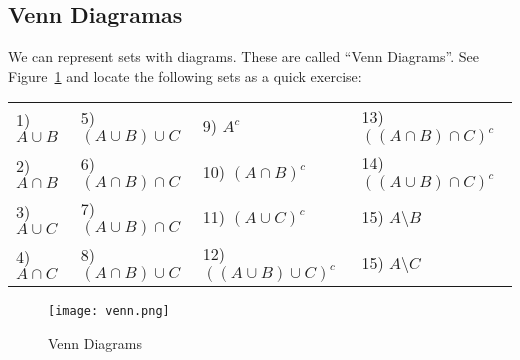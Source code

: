 \documentclass[11pt]{article}
\begin{document}
\subsection*{Venn Diagramas}
 We can represent sets with diagrams. These are called ``Venn Diagrams''. See Figure~\ref{f1} and locate the following sets as a quick exercise:\\

\begin{tabular}{llll}
	1) $A \cup B$ & 5) $(A \cup B) \cup C$ & 9) $A^c$ & 13) $((A \cap B) \cap C)^c$\\
	2) $A \cap B$ & 6) $(A \cap B) \cap C$ & 10) $(A \cap B)^c$ & 14) $((A \cup B) \cap C)^c$\\
	3) $A \cup C$ & 7) $(A \cup B) \cap C$ & 11) $(A \cup C)^c$ & 15) $A \setminus B$\\
	4) $A \cap C$ & 8) $(A \cap B) \cup C$ & 12) $((A \cup B) \cup C)^c$ & 15) $A \setminus C$\\
\end{tabular}

\begin{figure}[htp]
\centering
\texttt{[image: venn.png]}
\caption{Venn Diagrams}
\label{f1}
\end{figure}
\end{document}
